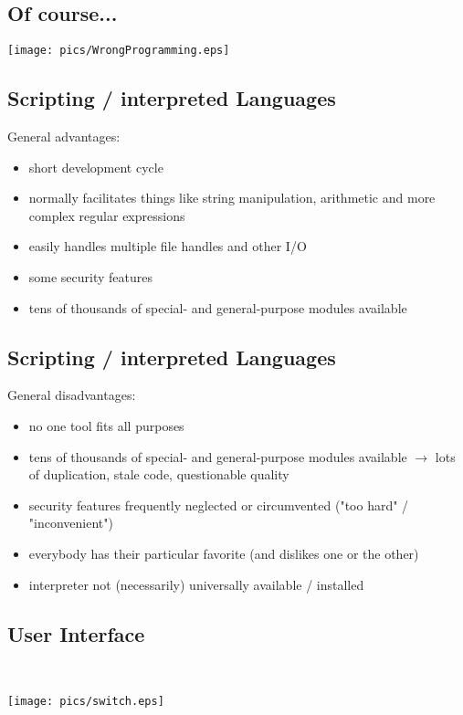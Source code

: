 \documentclass[xga]{xdvislides}
\begin{document}
\subsection{Of course...}
\vspace*{\fill}
\begin{center}
	\texttt{[image: pics/WrongProgramming.eps]}
\end{center}
\vspace*{\fill}


\subsection{Scripting / interpreted Languages}
General advantages:
\begin{itemize}
	\item short development cycle
	\item normally facilitates things like string manipulation,
		arithmetic and more complex regular expressions
	\item easily handles multiple file handles and other I/O
	\item some security features
	\item tens of thousands of special- and general-purpose modules
		available
\end{itemize}

\subsection{Scripting / interpreted Languages}
General disadvantages:
\begin{itemize}
	\item no one tool fits all purposes
	\item tens of thousands of special- and general-purpose modules
		available $\rightarrow$ lots of duplication, stale code,
		questionable quality
	\item security features frequently neglected or circumvented ("too
		hard" / "inconvenient")
	\item everybody has their particular favorite (and dislikes one or
		the other)
	\item interpreter not (necessarily) universally available /
		installed
\end{itemize}

\subsection{User Interface}
\\
\vspace*{\fill}
\begin{center}
	\texttt{[image: pics/switch.eps]}
\end{center}
\vspace*{\fill}
\end{document}
